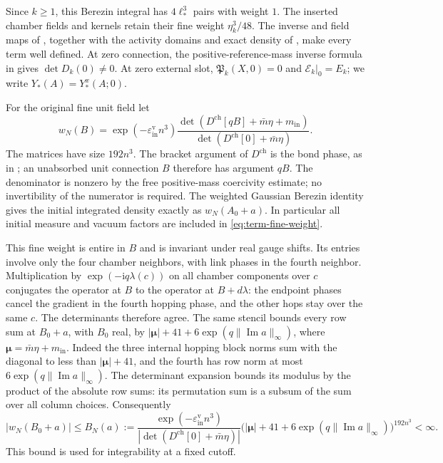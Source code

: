 Since $k\ge1$, this Berezin integral has $4\ell_*^3$
pairs with weight $1$. The inserted chamber fields
and kernels retain their fine weight $\eta_k^3/48$.
The inverse and field maps of \cite[Theorem~A and \S4.2]{FermionBlock},
together with the activity domains and exact density of
\cite[\S2.3 and \S3]{NonlinearStep}, make every term well defined.
At zero connection, the positive-reference-mass inverse formula in
\cite[Proposition~3.1]{NonlinearStep}
gives $\det D_k(0)\ne0$.
At zero external slot,
$\mathfrak P_k(X,0)=0$ and $\mathscr E_k|_0=E_k$;
we write $Y_*(A)=Y_*^x(A;0)$.

For the original fine unit field let
\begin{equation}\label{eq:term-fine-weight}
 w_N(B)=
 \exp(-\varepsilon_{\mathrm{in}}^{\mathrm v}n^3)
       \frac{\det(D^{\mathrm{ch}}[qB]+\bar m\eta+m_{\mathrm{in}})}
                              {\det(D^{\mathrm{ch}}[0]+\bar m\eta)} .
\end{equation}
The matrices have size $192n^3$.
The bracket argument of $D^{\mathrm{ch}}$ is the bond phase,
as in \cite[\S1.1, (6)]{PositiveProbe}; an unabsorbed unit
connection $B$ therefore has argument $qB$.
The denominator is nonzero by the free positive-mass
coercivity estimate; no invertibility of the numerator
is required.
The weighted Gaussian Berezin identity gives
the initial integrated density exactly as $w_N(A_0+a)$.
In particular all initial measure and vacuum factors
are included in \eqref{eq:term-fine-weight}.

This fine weight is entire in $B$ and is invariant
under real gauge shifts.
Its entries involve only the four chamber neighbors,
with link phases in the fourth neighbor.
Multiplication by $\exp(-\mathrm i q\lambda(c))$ on
all chamber components over $c$ conjugates the operator
at $B$ to the operator at $B+d\lambda$: the endpoint
phases cancel the gradient in the fourth hopping phase,
and the other hops stay over the same $c$.
The determinants therefore agree.
The same stencil bounds every row sum at $B_0+a$,
with $B_0$ real, by
$|\boldsymbol\mu|+41+6\exp(q\|\operatorname{Im}a\|_\infty)$,
where $\boldsymbol\mu=\bar m\eta+m_{\mathrm{in}}$.
Indeed the three internal hopping block norms sum
with the diagonal to less than $|\boldsymbol\mu|+41$,
and the fourth has row norm at most
$6\exp(q\|\operatorname{Im}a\|_\infty)$.
The determinant expansion bounds its modulus by
the product of the absolute row sums: its permutation
sum is a subsum of the sum over all column choices.
Consequently
\begin{equation}\label{eq:term-finite-density-bound}
 |w_N(B_0+a)|\le B_N(a):=
 \frac{\exp(-\varepsilon_{\mathrm{in}}^{\mathrm v}n^3)}
            {|\det(D^{\mathrm{ch}}[0]+\bar m\eta)|}
       \big(|\boldsymbol\mu|+41
                     +6\exp(q\|\operatorname{Im}a\|_\infty)\big)^{192n^3}
                                                        <\infty .
\end{equation}
This bound is used for integrability at a fixed cutoff.

